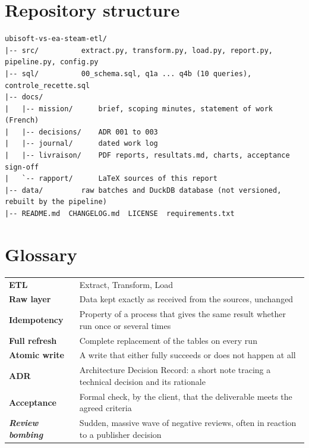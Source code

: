 \documentclass[11pt, a4paper, oneside, headings=normal, numbers=noenddot, DIV=12]{scrartcl}
\begin{document}
\section{Repository structure}
\begin{lstlisting}[basicstyle=\ttfamily\footnotesize]
ubisoft-vs-ea-steam-etl/
|-- src/          extract.py, transform.py, load.py, report.py, pipeline.py, config.py
|-- sql/          00_schema.sql, q1a ... q4b (10 queries), controle_recette.sql
|-- docs/
|   |-- mission/      brief, scoping minutes, statement of work (French)
|   |-- decisions/    ADR 001 to 003
|   |-- journal/      dated work log
|   |-- livraison/    PDF reports, resultats.md, charts, acceptance sign-off
|   `-- rapport/      LaTeX sources of this report
|-- data/         raw batches and DuckDB database (not versioned, rebuilt by the pipeline)
|-- README.md  CHANGELOG.md  LICENSE  requirements.txt
\end{lstlisting}

\section{Glossary}
\begin{tabularx}{\linewidth}{@{}>{\bfseries}L{3.6cm} Y@{}}
ETL & Extract, Transform, Load \\
Raw layer & Data kept exactly as received from the sources, unchanged \\
Idempotency & Property of a process that gives the same result whether run once or several times \\
Full refresh & Complete replacement of the tables on every run \\
Atomic write & A write that either fully succeeds or does not happen at all \\
ADR & Architecture Decision Record: a short note tracing a technical decision and its rationale \\
Acceptance & Formal check, by the client, that the deliverable meets the agreed criteria \\
\emph{Review bombing} & Sudden, massive wave of negative reviews, often in reaction to a publisher decision \\
\end{tabularx}
\end{document}
